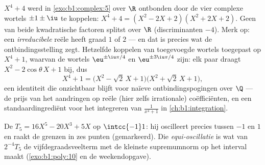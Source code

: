 \begin{example}\label{ex:b1:poly:factorexample}
$X^4 + 4$ werd in \cref{exo:b1:complex:5} over $\R$ ontbonden door de
vier complexe wortels $\pm 1 \pm \iu$ te koppelen: $X^4 + 4 = (X^2 - 2X +
2)(X^2 + 2X + 2)$. Geen van beide kwadratische factoren splitst over $\R$
(discriminanten $-4$). Merk op: een \emph{irreducibele} reële 
heeft graad $1$ of $2$ --- en dat is precies wat de ontbindingsstelling
zegt. Hetzelfde koppelen van toegevoegde wortels toegepast op $X^4 + 1$,
waarvan de wortels $\eu^{\pm\iu\pi/4}$ en $\eu^{\pm3\iu\pi/4}$ zijn: elk
paar draagt $X^2 - 2\cos\theta\,X + 1$ bij, dus
\[
X^4 + 1 = \bigl(X^2 - \sqrt2\,X + 1\bigr)
\bigl(X^2 + \sqrt2\,X + 1\bigr) ,
\]
een identiteit die onzichtbaar blijft voor naïeve ontbindingspogingen
over $\Q$ --- de prijs van het aandringen op reële (hier zelfs
irrationale) coëfficiënten, en een standaardingrediënt voor het
integreren van $\frac1{x^4 + 1}$ in \cref{ch:b1:integration}.
\end{example}

\begin{omfigure}

{\small De  $T_5 = 16X^5 - 20X^3 + 5X$ op
$\intcc{-1}1$: hij oscilleert precies tussen $-1$ en $1$ en raakt de
grenzen in zes punten (gemarkeerd). Die \emph{equi-oscillatie} is wat van
$2^{-4}T_5$ de  vijfdegraadsveelterm met de kleinste
supremumnorm op het interval maakt (\cref{exo:b1:poly:10} en de
weekendopgave).}
\end{omfigure}

